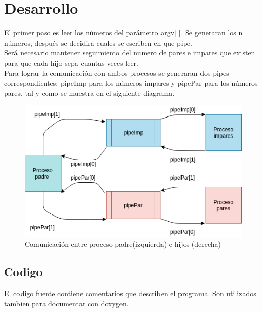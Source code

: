 \documentclass[12pt]{article}
\begin{document}
\section{Desarrollo}
El primer paso es leer los números del parámetro argv[ ]. Se generaran los n números, después se decidira cuales se escriben en que pipe.\\ Será necesario mantener seguimiento del numero de pares e impares que existen para que cada hijo sepa cuantas veces leer.\\Para lograr la comunicación con ambos procesos se generaran dos pipes correspondientes; pipeImp para los números impares y pipePar para los números pares, tal y como se muestra en el siguiente diagrama.
\begin{figure}[!htb]
    \centering
    \includegraphics[width=\textwidth*2/3]{pipes.png}
    \caption{Comunicación entre proceso padre(izquierda) e hijos (derecha)}
    \label{fig:listas}
\end{figure}
\pagebreak
\subsection{Codigo}
El codigo fuente contiene comentarios que describen el programa. Son utilizados tambien para documentar con doxygen.
\end{document}
